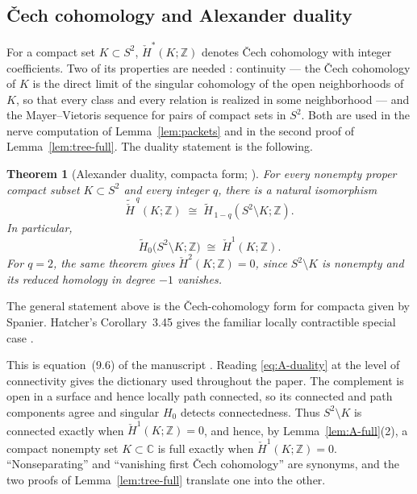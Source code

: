 \documentclass[11pt,reqno]{amsart}
\newtheorem{theorem}{Theorem}[section]
\theoremstyle{definition}
\theoremstyle{remark}
\newcommand{\C}{\mathbb C}
\newcommand{\Z}{\mathbb Z}
\begin{document}
\subsection{\v{C}ech cohomology and Alexander duality}
\label{subsec:A-duality}

For a compact set $K\subset S^2$, $\check H^*(K;\Z)$ denotes \v{C}ech
cohomology with integer coefficients.  Two of its properties are needed
\cite[Chapter~6]{Spa66}: continuity --- the \v{C}ech cohomology of $K$ is the direct
limit of the singular cohomology of the open neighborhoods of $K$, so
that every class and every relation is realized in some neighborhood ---
and the Mayer--Vietoris sequence for pairs of compact sets in $S^2$.
Both are used in the nerve computation of Lemma~\ref{lem:packets} and in
the second proof of Lemma~\ref{lem:tree-full}.  The duality statement is
the following.

\begin{theorem}[Alexander duality, compacta form;
{\cite[Chapter~6]{Spa66}}]\label{thm:A-duality}
For every nonempty proper compact subset $K\subset S^2$ and every integer
$q$, there is a natural isomorphism
\[
\widetilde{\check H}^{\,q}(K;\Z)
\;\cong\;
\widetilde H_{\,1-q}(S^2\setminus K;\Z).
\]
In particular,
\begin{equation}\label{eq:A-duality}
\widetilde H_0\bigl(S^2\setminus K;\Z\bigr)\;\cong\;\check H^1(K;\Z).
\end{equation}
For $q=2$, the same theorem gives $\check H^2(K;\Z)=0$, since
$S^2\setminus K$ is nonempty and its reduced homology in degree $-1$
vanishes.
\end{theorem}

The general statement above is the \v{C}ech-cohomology form for compacta
given by Spanier.  Hatcher's Corollary~3.45 gives the familiar locally
contractible special case \cite[pp.~255--257]{Hat02}.

This is equation~(9.6) of the manuscript \cite{MWman}.  Reading
\eqref{eq:A-duality} at the level of connectivity gives the dictionary
used throughout the paper.  The complement is open in a surface and hence
locally path connected, so its connected and path components agree and
singular $H_0$ detects connectedness.  Thus $S^2\setminus K$ is connected exactly when
$\check H^1(K;\Z)=0$, and hence, by Lemma~\ref{lem:A-full}(2), a compact
nonempty set $K\subset\C$ is full exactly when
$\check H^1(K;\Z)=0$.
``Nonseparating'' and ``vanishing first \v{C}ech cohomology'' are
synonyms, and the two proofs of Lemma~\ref{lem:tree-full} translate one
into the other.
\end{document}
